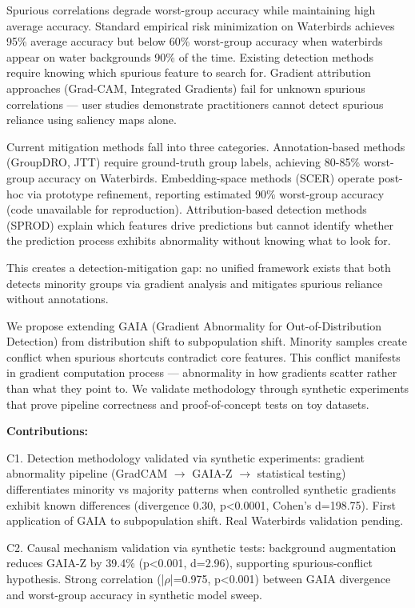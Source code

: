 
Spurious correlations degrade worst-group accuracy while maintaining high average accuracy. Standard empirical risk minimization on Waterbirds achieves 95\% average accuracy but below 60\% worst-group accuracy when waterbirds appear on water backgrounds 90\% of the time. Existing detection methods require knowing which spurious feature to search for. Gradient attribution approaches (Grad-CAM, Integrated Gradients) fail for unknown spurious correlations --- user studies demonstrate practitioners cannot detect spurious reliance using saliency maps alone.

Current mitigation methods fall into three categories. Annotation-based methods (GroupDRO, JTT) require ground-truth group labels, achieving 80-85\% worst-group accuracy on Waterbirds. Embedding-space methods (SCER) operate post-hoc via prototype refinement, reporting estimated 90\% worst-group accuracy (code unavailable for reproduction). Attribution-based detection methods (SPROD) explain which features drive predictions but cannot identify whether the prediction process exhibits abnormality without knowing what to look for.

This creates a detection-mitigation gap: no unified framework exists that both detects minority groups via gradient analysis and mitigates spurious reliance without annotations.

We propose extending GAIA (Gradient Abnormality for Out-of-Distribution Detection) from distribution shift to subpopulation shift. Minority samples create conflict when spurious shortcuts contradict core features. This conflict manifests in gradient computation process --- abnormality in how gradients scatter rather than what they point to. We validate methodology through synthetic experiments that prove pipeline correctness and proof-of-concept tests on toy datasets.

\textbf{Contributions:}

C1. Detection methodology validated via synthetic experiments: gradient abnormality pipeline (GradCAM $\rightarrow$ GAIA-Z $\rightarrow$ statistical testing) differentiates minority vs majority patterns when controlled synthetic gradients exhibit known differences (divergence 0.30, p<0.0001, Cohen's d=198.75). First application of GAIA to subpopulation shift. Real Waterbirds validation pending.

C2. Causal mechanism validation via synthetic tests: background augmentation reduces GAIA-Z by 39.4\% (p<0.001, d=2.96), supporting spurious-conflict hypothesis. Strong correlation (|$\rho$|=0.975, p<0.001) between GAIA divergence and worst-group accuracy in synthetic model sweep.

